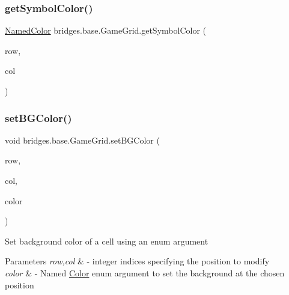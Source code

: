 \mbox{\label{classbridges_1_1base_1_1_game_grid_ab094ebfd585aac9440836ad6875ce094}} 
\subsubsection{\texorpdfstring{getSymbolColor()}{getSymbolColor()}}
{\footnotesize\ttfamily \mbox{\hyperlink{enumbridges_1_1base_1_1_named_color}{Named\+Color}} bridges.\+base.\+Game\+Grid.\+get\+Symbol\+Color (\begin{DoxyParamCaption}\item[{Integer}]{row,  }\item[{Integer}]{col }\end{DoxyParamCaption})}

\mbox{\label{classbridges_1_1base_1_1_game_grid_a72d7d5b03b78fdc4110cee955727a523}} 
\subsubsection{\texorpdfstring{setBGColor()}{setBGColor()}\hspace{0.1cm}{\footnotesize\ttfamily [1/2]}}
{\footnotesize\ttfamily void bridges.\+base.\+Game\+Grid.\+set\+B\+G\+Color (\begin{DoxyParamCaption}\item[{Integer}]{row,  }\item[{Integer}]{col,  }\item[{\mbox{\hyperlink{enumbridges_1_1base_1_1_named_color}{Named\+Color}}}]{color }\end{DoxyParamCaption})}

Set background color of a cell using an enum argument


\begin{DoxyParams}{Parameters}
{\em row,col} & -\/ integer indices specifying the position to modify \\
\hline
{\em color} & -\/ Named \mbox{\hyperlink{classbridges_1_1base_1_1_color}{Color}} enum argument to set the background at the chosen position \\
\hline
\end{DoxyParams}
\mbox{\label{classbridges_1_1base_1_1_game_grid_ad655bef3f2c24cc19f222b86b5d31373}} 
